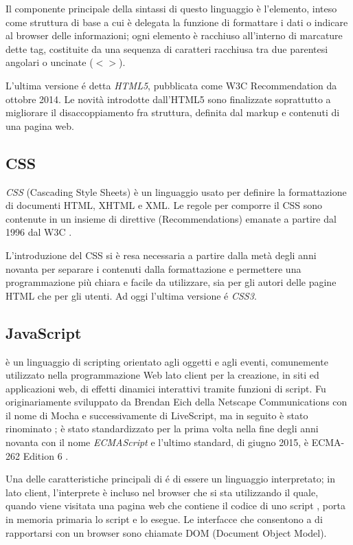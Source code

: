 Il componente principale della sintassi di questo linguaggio è l'elemento, inteso come struttura di base a cui è delegata la funzione di formattare i dati o indicare al browser delle informazioni; ogni elemento è racchiuso all'interno di marcature dette tag, costituite da una sequenza di caratteri racchiusa tra due parentesi angolari o uncinate ($< >$).

L'ultima versione é detta \emph{HTML5}, pubblicata come W3C Recommendation da ottobre 2014. Le novità introdotte dall'HTML5 sono finalizzate soprattutto a migliorare il disaccoppiamento fra struttura, definita dal markup e contenuti di una pagina web.

\subsection{CSS}
\label{subs:css}
\emph{CSS} (Cascading Style Sheets) è un linguaggio usato per definire la formattazione di documenti HTML, XHTML e XML. Le regole per comporre il CSS sono contenute in un insieme di direttive (Recommendations) emanate a partire dal 1996 dal W3C \cite{css}.

L'introduzione del CSS si è resa necessaria a partire dalla metà degli anni novanta per separare i contenuti dalla formattazione e permettere una programmazione più chiara e facile da utilizzare, sia per gli autori delle pagine HTML che per gli utenti. Ad oggi l'ultima versione é \emph{CSS3}.

\subsection{JavaScript}
\label{subs:js}
\emph{{\js}} è un linguaggio di scripting orientato agli oggetti e agli eventi, comunemente utilizzato nella programmazione Web lato client per la creazione, in siti ed applicazioni web, di effetti dinamici interattivi tramite funzioni di script. Fu originariamente sviluppato da Brendan Eich della Netscape Communications con il nome di Mocha e successivamente di LiveScript, ma in seguito è stato rinominato {\js}; è stato standardizzato per la prima volta nella fine degli anni novanta con il nome \emph{ECMAScript} e l'ultimo standard, di giugno 2015, è ECMA-262 Edition 6 \cite{jsecma}.

Una delle caratteristiche principali di {\js} é di essere un linguaggio interpretato; in {\js} lato client, l'interprete è incluso nel browser che si sta utilizzando il quale, quando viene visitata una pagina web che contiene il codice di uno script {\js}, porta in memoria primaria lo script e lo esegue. Le interfacce che consentono a {\js} di rapportarsi con un browser sono chiamate DOM (Document Object Model). 

